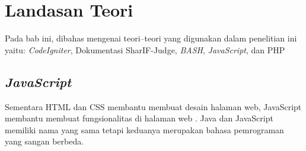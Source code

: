\chapter{Landasan Teori}
\label{chap:teori}
Pada bab ini, dibahas mengenai teori–teori yang digunakan dalam penelitian ini yaitu: \textit{CodeIgniter}, Dokumentasi SharIF-Judge, \textit{BASH}, \textit{JavaScript}, dan PHP

\section{\textit{JavaScript}}
\label{sec:JavaScript} 
Sementara HTML dan CSS membantu membuat desain halaman web, JavaScript membantu membuat fungsionalitas di halaman web \cite{javascriptlearn}. Java dan JavaScript memiliki nama yang sama tetapi keduanya merupakan bahasa pemrograman yang sangan berbeda.


